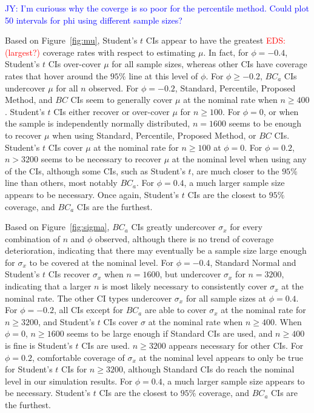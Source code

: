 \documentclass[12pt, letterpaper, titlepage]{article}
\newcommand{\jy}[1]{\textcolor{blue}{JY: #1}}
\newcommand{\eds}[1]{\textcolor{red}{EDS: (#1)}}
\begin{document}
\jy{I'm curiouss why the coverge is so poor for the percentile method. Could
  plot 50 intervals for phi using different sample sizes?}

Based on Figure~\ref{fig:mu}, 
Student's $t$ CIs appear to have the greatest \eds{largest?} coverage rates with 
respect 
to estimating $\mu$. In fact, for $\phi = -0.4$, Student's $t$ CIs over-cover 
$\mu$ for all sample sizes, whereas other CIs have coverage rates that
hover around the $95\%$ line at this level of $\phi$. For $\phi \geq -0.2$,
$BC_a$ CIs undercover $\mu$ for all $n$ observed. For $\phi = -0.2$, 
Standard, Percentile, %
Proposed Method, and $BC$ CIs seem to 
generally cover $\mu$ at the nominal 
rate when $n \geq 400$. Student's $t$ CIs either recover or over-cover $\mu$
for $n \geq 100$. For $\phi = 0$, or when the 
sample is independently normally distributed, $n = 1600$ seems to 
be enough to recover $\mu$ when using Standard, Percentile, 
Proposed Method, or $BC$ 
CIs. Student's $t$ CIs cover $\mu$ at the nominal rate for $n \geq 100$ at 
$\phi = 0$.
For $\phi = 0.2$, $n > 3200$ seems to be necessary to recover $\mu$
at the nominal level when using
any of the CIs, although some CIs, such as Student's $t$, are much closer to the
$95\%$ line than others, most notably $BC_a$.
For $\phi = 0.4$, a much larger sample size appears to be necessary. Once again,
Student's $t$ CIs are the closest to $95\%$ coverage, and $BC_a$ CIs are the 
furthest.

Based on Figure~\ref{fig:sigma}, 
$BC_a$ CIs greatly undercover $\sigma_x$ for every combination of $n$ and 
$\phi$ observed, although there is no trend of coverage deterioration, 
indicating that there may eventually
be a sample size large enough for $\sigma_x$ to be covered at the nominal level.
For $\phi = -0.4$, Standard Normal and Student's $t$ CIs recover $\sigma_x$ when 
$n = 1600$, but undercover $\sigma_x$ for $n = 3200$, indicating
that a larger $n$ is most likely necessary to consistently cover $\sigma_x$ at 
the nominal rate.
The other CI types undercover $\sigma_x$ for all sample sizes at $\phi = 0.4$.
For $\phi  = -0.2$, all CIs except for $BC_a$ are able to cover $\sigma_x$ at 
the nominal rate for $n \geq 3200$, and Student's $t$ CIs cover $\sigma$ at the 
nominal rate when $n \geq 400$. When $\phi = 0$, $n \geq 1600$ seems to 
be large enough if Standard CIs are used, and $n \geq 400$ is fine is
Student's $t$ CIs are used. $n \geq 3200$ appears necessary 
for other CIs. For $\phi = 0.2$, 
comfortable coverage of $\sigma_x$ at the nominal level appears to only be true
for Student's $t$ CIs for $n \geq 3200$, although Standard %
CIs do reach the nominal level in our simulation results. For $\phi = 0.4$, a much
larger sample size appears to be necessary. Student's $t$ CIs are the closest to
$95\%$ coverage, and $BC_a$ CIs are the furthest.
\end{document}
